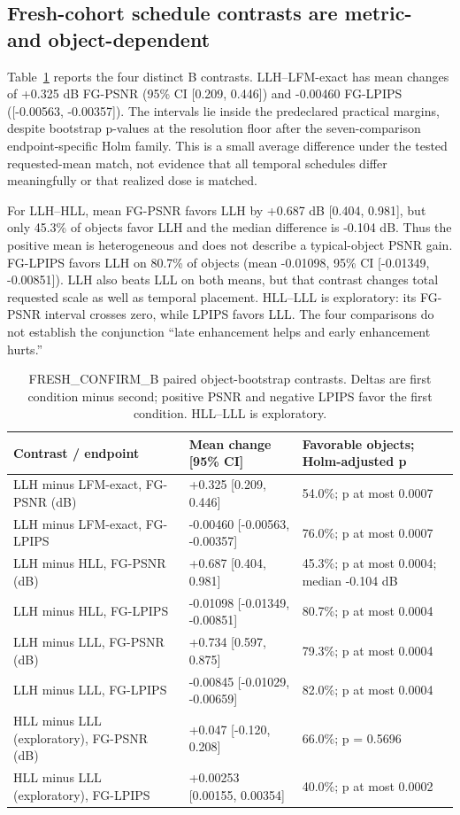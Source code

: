 \documentclass[times,twocolumn,final]{elsarticle}
\begin{document}
\subsection{Fresh-cohort schedule contrasts are metric- and object-dependent}

Table~\ref{tab:temporal} reports the four distinct B contrasts. LLH--LFM-exact has mean changes of +0.325 dB FG-PSNR (95\% CI [0.209, 0.446]) and -0.00460 FG-LPIPS ([-0.00563, -0.00357]). The intervals lie inside the predeclared practical margins, despite bootstrap p-values at the resolution floor after the seven-comparison endpoint-specific Holm family. This is a small average difference under the tested requested-mean match, not evidence that all temporal schedules differ meaningfully or that realized dose is matched.

For LLH--HLL, mean FG-PSNR favors LLH by +0.687 dB [0.404, 0.981], but only 45.3\% of objects favor LLH and the median difference is -0.104 dB. Thus the positive mean is heterogeneous and does not describe a typical-object PSNR gain. FG-LPIPS favors LLH on 80.7\% of objects (mean -0.01098, 95\% CI [-0.01349, -0.00851]). LLH also beats LLL on both means, but that contrast changes total requested scale as well as temporal placement. HLL--LLL is exploratory: its FG-PSNR interval crosses zero, while LPIPS favors LLL. The four comparisons do not establish the conjunction “late enhancement helps and early enhancement hurts.”

\begin{table}[t]
\centering\small
\caption{FRESH\_CONFIRM\_B paired object-bootstrap contrasts. Deltas are first condition minus second; positive PSNR and negative LPIPS favor the first condition. HLL--LLL is exploratory.}
\label{tab:temporal}
\begin{tabular}{p{}p{}p{}}
\toprule
Contrast / endpoint & Mean change [95\% CI] & Favorable objects; Holm-adjusted p \\
\midrule
LLH minus LFM-exact, FG-PSNR (dB) & +0.325 [0.209, 0.446] & 54.0\%; p at most 0.0007 \\
LLH minus LFM-exact, FG-LPIPS & -0.00460 [-0.00563, -0.00357] & 76.0\%; p at most 0.0007 \\
LLH minus HLL, FG-PSNR (dB) & +0.687 [0.404, 0.981] & 45.3\%; p at most 0.0004; median -0.104 dB \\
LLH minus HLL, FG-LPIPS & -0.01098 [-0.01349, -0.00851] & 80.7\%; p at most 0.0004 \\
LLH minus LLL, FG-PSNR (dB) & +0.734 [0.597, 0.875] & 79.3\%; p at most 0.0004 \\
LLH minus LLL, FG-LPIPS & -0.00845 [-0.01029, -0.00659] & 82.0\%; p at most 0.0004 \\
HLL minus LLL (exploratory), FG-PSNR (dB) & +0.047 [-0.120, 0.208] & 66.0\%; p = 0.5696 \\
HLL minus LLL (exploratory), FG-LPIPS & +0.00253 [0.00155, 0.00354] & 40.0\%; p at most 0.0002 \\
\bottomrule
\end{tabular}
\end{table}
\end{document}
